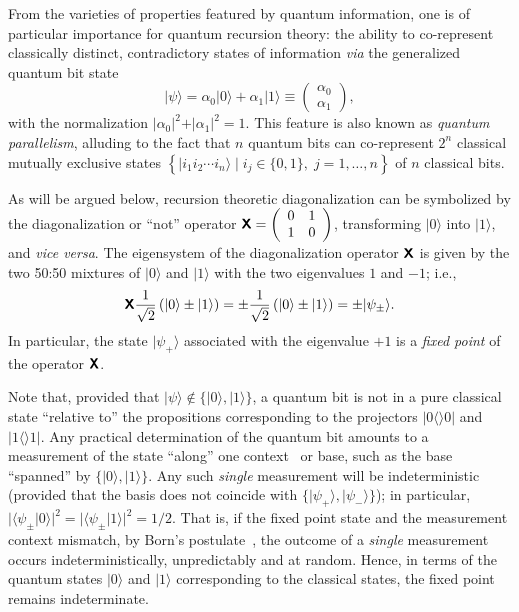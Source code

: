 \documentclass[prl,amsfonts,amsmath,showpacs,showkeys,preprint]{revtex4}
\begin{document}
From the varieties of properties featured by quantum information,
one is of particular importance for quantum recursion theory:
the ability to co-represent classically distinct, contradictory states of information {\it via} the generalized quantum bit state
\begin{equation}
\vert \psi \rangle = \alpha_0 \vert 0\rangle + \alpha_1 \vert 1\rangle \equiv \left(
\begin{array}{c}
\alpha_0\\
\alpha_1
\end{array}
\right),
\end{equation}
with the normalization $\vert \alpha_0 \vert^2  +\vert \alpha_1 \vert^2 =1$.
This feature is also known as {\em quantum parallelism},
alluding to the fact that $n$ quantum bits can co-represent $2^n$ classical mutually exclusive states
$\left\{ \vert i_1 i_2 \cdots i_n\rangle \mid i_j\in \{0,1\}, \; j=1,\ldots ,n\right\}$ of $n$ classical bits.


As will be argued below, recursion theoretic diagonalization can be symbolized by the diagonalization or ``not'' operator
$\textsf{\textbf{X}}=
\left(
\begin{array}{cc}
0&1\\
1&0
\end{array}
\right)$, transforming $\vert 0\rangle$ into $\vert 1\rangle$, and {\it vice versa}.
The eigensystem of the diagonalization  operator  $\textsf{\textbf{X}}$
is given by the two 50:50 mixtures of $\vert 0\rangle $ and $\vert 1\rangle $
with the two eigenvalues $1$ and $-1$; i.e.,
\begin{equation}
\textsf{\textbf{X}}\frac{1}{\sqrt{2}}\left( \vert 0\rangle \pm \vert 1\rangle   \right)
= \pm \frac{1}{\sqrt{2}}\left( \vert 0\rangle \pm \vert 1\rangle   \right) = \pm \vert \psi_\pm \rangle.
\end{equation}
In particular,  the state   $\vert \psi_+ \rangle$ associated with the eigenvalue $+1$
is a {\em fixed point} of the operator $\textsf{\textbf{X}}$.


Note that, provided that $\vert \psi \rangle \not\in \{\vert 0 \rangle,\vert 1 \rangle \}$, a
quantum bit is not in a pure classical state ``relative to'' the propositions corresponding to the projectors $\vert 0\langle \rangle 0\vert$
and $\vert 1\langle \rangle 1\vert$.
Any practical determination of the quantum bit amounts to a measurement of the state ``along'' one context~\cite{svozil-2008-ql}
or base, such as the base ``spanned'' by $\{\vert 0 \rangle,\vert 1 \rangle \}$.
 Any such {\em single} measurement will be
indeterministic (provided  that the basis does not coincide with $\{\vert \psi_+ \rangle,\vert \psi_- \rangle\}$);
in particular, $\vert \langle \psi_\pm \vert 0\rangle \vert^2=\vert \langle \psi_\pm \vert 1\rangle \vert^2= 1/2$.
That is, if the fixed point state and the measurement context mismatch,
by Born's postulate~\cite{born-26-1,zeil-05_nature_ofQuantum},
the outcome of a {\em single} measurement occurs indeterministically, unpredictably and at random.
Hence, in terms of the quantum states $\vert 0 \rangle$ and $\vert 1 \rangle$ corresponding to the classical states,
the fixed point remains indeterminate.
\end{document}
